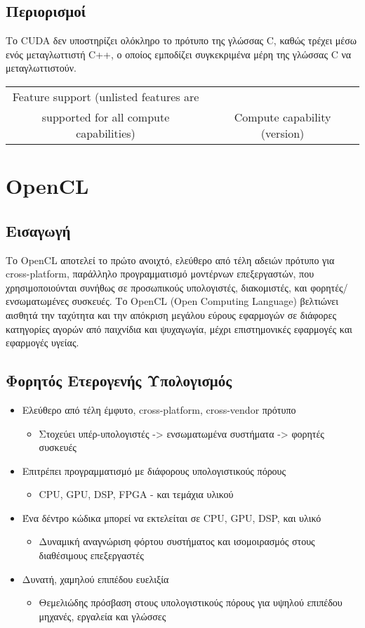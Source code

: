 \subsection{Περιορισμοί}
 Το CUDA δεν υποστηρίζει ολόκληρο το πρότυπο της γλώσσας C, καθώς τρέχει μέσω ενός μεταγλωττιστή C++, ο οποίος εμποδίζει συγκεκριμένα μέρη της γλώσσας C να μεταγλωττιστούν.
 
\begin{table}
\begin{tabular}{ | c | c |}
Feature support (unlisted features are\\ supported for all compute capabilities) & Compute capability (version)\\ \hline
\end{tabular}
\end{table}

\section{OpenCL}
\subsection{Εισαγωγή}
Το OpenCL αποτελεί το πρώτο ανοιχτό, ελεύθερο από τέλη αδειών πρότυπο για cross-platform, παράλληλο προγραμματισμό μοντέρνων επεξεργαστών, που χρησιμοποιούνται συνήθως σε προσωπικούς υπολογιστές, διακομιστές, και φορητές/ενσωματωμένες συσκευές. Το OpenCL (Open Computing Language) βελτιώνει αισθητά την ταχύτητα και την απόκριση μεγάλου εύρους εφαρμογών σε διάφορες κατηγορίες αγορών από παιχνίδια και ψυχαγωγία, μέχρι επιστημονικές εφαρμογές και εφαρμογές υγείας.
\subsection{Φορητός Ετερογενής Υπολογισμός}
\begin{itemize}
\item Ελεύθερο από τέλη έμφυτο, cross-platform, cross-vendor πρότυπο
	\begin{itemize}
	\item Στοχεύει υπέρ-υπολογιστές -> ενσωματωμένα συστήματα -> φορητές συσκευές
	\end{itemize}
\item Επιτρέπει προγραμματισμό με διάφορους υπολογιστικούς πόρους
	\begin{itemize}
	\item CPU, GPU, DSP, FPGA - και τεμάχια υλικού
	\end{itemize}
\item Ένα δέντρο κώδικα μπορεί να εκτελείται σε CPU, GPU, DSP, και υλικό
	\begin{itemize}
	\item Δυναμική αναγνώριση φόρτου συστήματος και ισομοιρασμός στους διαθέσιμους επεξεργαστές
	\end{itemize}
\item Δυνατή, χαμηλού επιπέδου ευελιξία
	\begin{itemize}
	\item Θεμελιώδης πρόσβαση στους υπολογιστικούς πόρους για υψηλού επιπέδου μηχανές, εργαλεία και γλώσσες
	\end{itemize}
\end{itemize}
